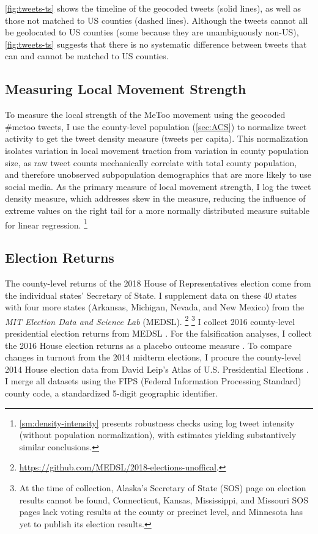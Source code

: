 \documentclass[manuscript,screen,nonacm,11pt,acm]{acmart}
\begin{document}
\cref{fig:tweets-ts} shows the timeline of the geocoded tweets (solid lines), as well as those not matched to US counties (dashed lines).
Although the tweets cannot all be geolocated to US counties (some because they are unambiguously non-US), \cref{fig:tweets-ts} suggests that there is no systematic difference between tweets that can and cannot be matched to US counties.

\subsection{Measuring Local Movement Strength}
\label{sec:local-measure}
To measure the local strength of the MeToo movement using the geocoded \#metoo tweets, I use the county-level population (\cref{sec:ACS}) to normalize tweet activity to get the tweet density measure (tweets per capita).
This normalization isolates variation in local movement traction from variation in county population size, as raw tweet counts mechanically correlate with total county population, and therefore unobserved subpopulation demographics that are more likely to use social media.
As the primary measure of local movement strength, I log the tweet density measure, which addresses skew in the measure, reducing the influence of extreme values on the right tail for a more normally distributed measure suitable for linear regression.%
\footnote{\cref{sm:density-intensity} presents robustness checks using log tweet intensity (without population normalization), with estimates yielding substantively similar conclusions.}

\subsection{Election Returns}
The county-level returns of the 2018 House of Representatives election come from the individual states' Secretary of State.
I supplement data on these 40 states with four more states (Arkansas, Michigan, Nevada, and New Mexico) from the \emph{MIT Election Data and Science Lab} (MEDSL).%
\footnote{\url{https://github.com/MEDSL/2018-elections-unoffical}.} 
\footnote{At the time of collection, Alaska's Secretary of State (SOS) page on election results cannot be found, Connecticut, Kansas, Mississippi, and Missouri SOS pages lack voting results at the county or precinct level, and Minnesota has yet to publish its election results.}
I collect 2016 county-level presidential election returns from MEDSL \citep{mitCountyPres}.
For the falsification analyses, I collect the 2016 House election returns as a placebo outcome measure \citep{mitCountyHouse2016}.
To compare changes in turnout from the 2014 midterm elections, I procure the county-level 2014 House election data from David Leip's Atlas of U.S. Presidential Elections \citep{dlusa}.
I merge all datasets using the FIPS (Federal Information Processing Standard) county code, a standardized 5-digit geographic identifier.
\end{document}
